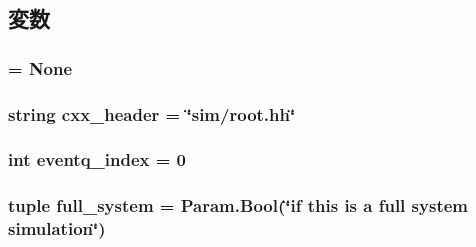 \subsection{変数}
\hypertarget{classRoot_1_1Root_adeccc2b824ad3c0462ec82cc6465d8ae}{
\subsubsection[{\_\-the\_\-instance}]{ = None}}
\label{classRoot_1_1Root_adeccc2b824ad3c0462ec82cc6465d8ae}
\hypertarget{classRoot_1_1Root_a17da7064bc5c518791f0c891eff05fda}{
\subsubsection[{cxx\_\-header}]{\setlength{\rightskip}{0pt plus 5cm}string {\bf cxx\_\-header} = \char`\"{}sim/root.hh\char`\"{}}}
\label{classRoot_1_1Root_a17da7064bc5c518791f0c891eff05fda}
\hypertarget{classRoot_1_1Root_a76f54d4ab6be836ebb29c4626581bb83}{
\subsubsection[{eventq\_\-index}]{\setlength{\rightskip}{0pt plus 5cm}int {\bf eventq\_\-index} = 0}}
\label{classRoot_1_1Root_a76f54d4ab6be836ebb29c4626581bb83}
\hypertarget{classRoot_1_1Root_a63a02cfa137741181a2af17e02bcea9b}{
\subsubsection[{full\_\-system}]{\setlength{\rightskip}{0pt plus 5cm}tuple {\bf full\_\-system} = Param.Bool(\char`\"{}if this is a full system simulation\char`\"{})}}

